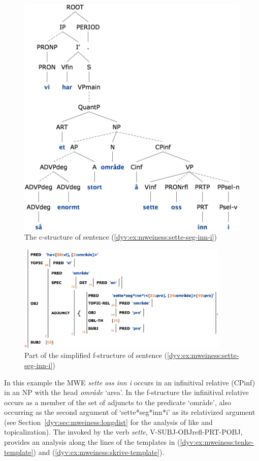 \documentclass[output=paper]{langsci/langscibook}
\begin{document}
\begin{figure}
  \includegraphics[height=.47\textheight]{figures/sette-seg-inn-i-c.png}
  \caption{The c-structure of sentence (\ref{dyv:ex:mweiness:sette-seg-inn-i})}
  \label{dyv:fig:mweiness:sette-seg-inn-i-c}
\end{figure}

\begin{figure}
  \includegraphics[width=0.9\textwidth]{figures/sette-seg-inn-i-f.png}
  \caption{Part of the simplified f-structure of sentence (\ref{dyv:ex:mweiness:sette-seg-inn-i})}
  \label{dyv:fig:mweiness:sette-seg-inn-i-f}
\end{figure}

In this example the MWE  \textit{sette oss inn i} occurs in an infinitival relative (CPinf) in an NP with the head \textit{område} `area'.
In the f-structure the infinitival relative occurs as a member of the set of adjuncts to the predicate `område', also occurring as the second argument of `sette*seg*inn*i' as its relativized argument (see Section~\ref{dyv:sec:mweiness:longdist} for the analysis of  like  and topicalization).
The  invoked by the verb \textit{sette}, V-SUBJ-OBJrefl-PRT-POBJ, provides an analysis along the lines of the templates in (\ref{dyv:ex:mweiness:tenke-template}) and (\ref{dyv:ex:mweiness:skrive-template}).
\end{document}
